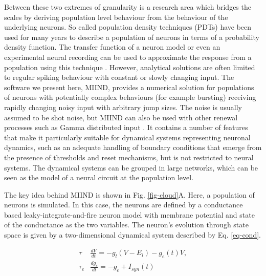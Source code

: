 \documentclass[utf8]{frontiersSCNS} %
\begin{document}
Between these two extremes of granularity is a research area which bridges the scales by deriving population level behaviour from the behaviour of the underlying neurons. So called population density techniques (PDTs) have been used for many years \citep{knight1972dynamics,knight1996dynamical,omurtag2000} to describe a population of neurons in terms of a probability density function. The transfer function of a neuron model or even an experimental neural recording can be used to approximate the response from a population using this technique \citep{wilson1972excitatory,el2009master,carlu2020mean}. However, analytical solutions are often limited to regular spiking behaviour with constant or slowly changing input. The software we present here, MIIND, provides a numerical solution for populations of neurons with potentially complex behaviours (for example bursting) receiving rapidly changing noisy input with arbitrary jump sizes. The noise is usually assumed to be shot noise, but MIIND can also be used with other renewal processes such as Gamma distributed input \citep{lai2017population}. 
It contains a number of features that make it particularly suitable for dynamical systems representing neuronal dynamics, such as an adequate handling of boundary conditions that emerge from the presence of thresholds and reset mechanisms, but is not restricted to neural systems. The dynamical systems can be grouped in large networks, which can be seen as the model of a neural circuit at the population level.

The key idea behind MIIND is shown in Fig. \ref{fig-cloud}A. Here, a population of neurons is simulated. In this case, the neurons are defined by a conductance based leaky-integrate-and-fire neuron model with membrane potential and state of the conductance as the two variables. The neuron's evolution through state space is given by a two-dimensional dynamical system described by Eq. \ref{eq-cond}. 

\begin{equation}
\begin{aligned}
\tau &\frac{dV}{dt} = -g_l(V - E_l) - g_e(t)V, \\
\tau_e &\frac{dg_e}{dt} = -g_e + I_{syn}(t)
\label{eq-cond}
\end{aligned}
\end{equation}
\end{document}
